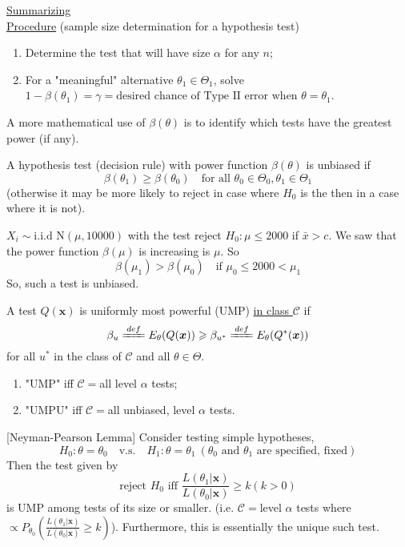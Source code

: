 \documentclass[english, 11pt]{article}
\begin{document}
\underline{Summarizing}\\
\underline{Procedure} (sample size determination for a hypothesis test)\\
\begin{enumerate}
\item Determine the test that will have size $\alpha$ for any $n$;
\item For a "meaningful" alternative $\theta_1\in\Theta_1$, solve $1-\beta(\theta_1)=\gamma=\text{desired chance of Type II error when $\theta=\theta_1$}$.
\end{enumerate}
A more mathematical use of $\beta(\theta)$ is to identify which tests have the greatest power (if any).
\begin{defn}\label{defn:58}
A hypothesis test (decision rule) with power function $\beta(\theta)$ is unbiased if 
$$
\beta(\theta_1)\geqslant \beta(\theta_0)\quad\text{for all $\theta_0\in\Theta_0, \theta_1\in\Theta_1$}
$$
(otherwise it may be more likely to reject in case where $H_0$ is the then in a case where it is not).
\end{defn}
\begin{exmp}
$X_i\sim\text{i.i.d N}(\mu, 10000)$ with the test reject $H_0:\mu\leqslant 2000$ if $\bar{x}>c$. We saw that the power function $\beta(\mu)$ is increasing is $\mu$. So
$$
\beta(\mu_1)>\beta(\mu_0)\quad\text{if $\mu_0\leqslant2000<\mu_1$}
$$
So, such a test is unbiased.
\end{exmp}
\begin{defn}\label{defn:59}
A test $Q(\bm{x})$ is uniformly most powerful (UMP) \underline{in class $\mathscr{C}$} if
$$
\beta_u\xlongequal{def}E_\theta(Q(\bm{x}))\geqslant\beta_{u^*}\xlongequal{def}E_\theta(Q^*(\bm{x}))
$$
for all $u^*$ in the class of $\mathscr{C}$ and all $\theta\in\Theta$.
\begin{enumerate}
\item "UMP" iff $\mathscr{C}=$all level $\alpha$ tests;
\item "UMPU" iff $\mathscr{C}=$all unbiased, level $\alpha$ tests.
\end{enumerate}
\end{defn}

\begin{thrm}\label{thrm:510}[Neyman-Pearson Lemma]
Consider testing simple hypotheses,
$$
H_0:\theta=\theta_0\quad\text{v.s.}\quad H_1:\theta=\theta_1\ (\theta_0 \text{ and }\theta_1\text{ are specified, fixed})
$$
Then the test given by
$$
\text{reject $H_0$ iff $\frac{L(\theta_1|\bm{x})}{L(\theta_0|\bm{x})}\geqslant k(k>0)$}
$$
is UMP among tests of its size or smaller. (i.e. $\mathscr{C}=$level $\alpha$ tests where $\propto P_{\theta_0}\left(\frac{L(\theta_1|\bm{x})}{L(\theta_0|\bm{x})}\geqslant k\right)$). Furthermore, this is essentially the unique such test.
\end{thrm}
\end{document}
